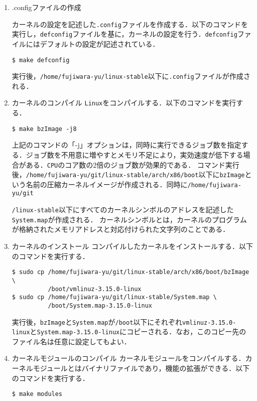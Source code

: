 \documentclass[12pt]{jsarticle}
\begin{document}
\begin{enumerate}
\item .configファイルの作成

カーネルの設定を記述した\verb|.config|ファイルを作成する．以下のコマンドを実行し，\verb|defconfig|ファイルを基に，カーネルの設定を行う．\verb|defconfig|ファイルにはデフォルトの設定が記述されている．
\begin{verbatim}
$ make defconfig
\end{verbatim}
実行後，\verb|/home/fujiwara-yu/linux-stable|以下に\verb|.config|ファイルが作成される．

\item カーネルのコンパイル
\verb|Linux|をコンパイルする．以下のコマンドを実行する．
\begin{verbatim}
$ make bzImage -j8
\end{verbatim}
上記のコマンドの「-j」オプションは，同時に実行できるジョブ数を指定する．ジョブ数を不用意に増やすとメモリ不足により，実効速度が低下する場合がある．\verb|CPU|のコア数の2倍のジョブ数が効果的である．
コマンド実行後，\verb|/home/fujiwara-yu/git/linux-stable/arch/x86/boot|以下に\verb|bzImage|という名前の圧縮カーネルイメージが作成される．同時に\verb|/home/fujiwara-yu/git|

\verb|/linux-stable|以下にすべてのカーネルシンボルのアドレスを記述した\verb|System.map|が作成される．
カーネルシンボルとは，カーネルのプログラムが格納されたメモリアドレスと対応付けられた文字列のことである．

\item カーネルのインストール
コンパイルしたカーネルをインストールする．以下のコマンドを実行する．
\begin{verbatim}
$ sudo cp /home/fujiwara-yu/git/linux-stable/arch/x86/boot/bzImage \
          /boot/vmlinuz-3.15.0-linux
$ sudo cp /home/fujiwara-yu/git/linux-stable/System.map \
          /boot/System.map-3.15.0-linux
\end{verbatim}
実行後，\verb|bzImage|と\verb|System.map|が\verb|/boot|以下にそれぞれ\verb|vmlinuz-3.15.0-linux|と\verb|System.map-3.15.0-linux|にコピーされる．なお，このコピー先のファイル名は任意に設定してもよい．


\item カーネルモジュールのコンパイル
カーネルモジュールをコンパイルする．カーネルモジュールとはバイナリファイルであり，機能の拡張ができる．以下のコマンドを実行する．
\begin{verbatim}
$ make modules
\end{verbatim}


\end{enumerate}
\end{document}
